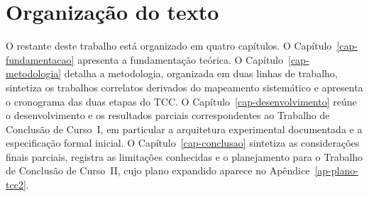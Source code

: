 \section{Organização do texto}
\label{sec-organizacao}

O restante deste trabalho está organizado em quatro capítulos. O Capítulo~\ref{cap-fundamentacao} apresenta a fundamentação teórica. O Capítulo~\ref{cap-metodologia} detalha a metodologia, organizada em duas linhas de trabalho, sintetiza os trabalhos correlatos derivados do mapeamento sistemático e apresenta o cronograma das duas etapas do TCC. O Capítulo~\ref{cap-desenvolvimento} reúne o desenvolvimento e os resultados parciais correspondentes ao Trabalho de Conclusão de Curso~I, em particular a arquitetura experimental documentada e a especificação formal inicial. O Capítulo~\ref{cap-conclusao} sintetiza as considerações finais parciais, registra as limitações conhecidas e o planejamento para o Trabalho de Conclusão de Curso~II, cujo plano expandido aparece no Apêndice~\ref{ap-plano-tcc2}. 
